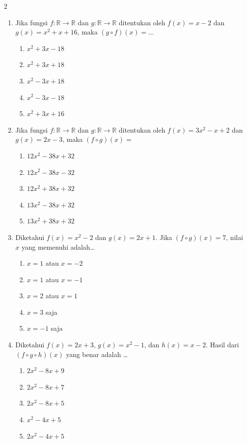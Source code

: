 \documentclass[10pt,a4paper]{article}
\begin{document}
\begin{multicols}{2}
\begin{enumerate}
    \item Jika fungsi $f: \mathbb{R}\to\mathbb{R}$ dan $g: \mathbb{R}\to\mathbb{R}$ ditentukan oleh $f(x)=x-2$ dan $g(x)=x^2+x+16$, maka $(g\circ f)(x)=\dots$
    \begin{enumerate}
        \item $x^2+3x-18$
        \item $x^2+3x+18$
        \item $x^2-3x+18$
        \item $x^2-3x-18$
        \item $x^2+3x+16$
    \end{enumerate}

    \item Jika fungsi $f: \mathbb{R}\to\mathbb{R}$ dan $g: \mathbb{R}\to\mathbb{R}$ ditentukan oleh $f(x)=3x^2-x+2$ dan $g(x)=2x-3$, maka $(f\circ g)(x)=$
    \begin{enumerate}
        \item $12x^2-38x+32$
        \item $12x^2-38x-32$
        \item $12x^2+38x+32$
        \item $13x^2-38x+32$
        \item $13x^2+38x+32$
    \end{enumerate}

    \item Diketahui $f(x)=x^2-2$ dan $g(x)=2x+1$. Jika $(f\circ g)(x)=7$, nilai $x$ yang memenuhi adalah\dots
    \begin{enumerate}
        \item $x = 1$ atau $x = -2$
        \item $x = 1$ atau $x = -1$
        \item $x = 2$ atau $x = 1$
        \item $x = 3$ saja
        \item $x = -1$ saja
    \end{enumerate}

    \item Diketahui $f(x)=2x+3$, $g(x)=x^2-1$, dan $h(x)=x-2$. Hasil dari $(f\circ g\circ h)(x)$ yang benar adalah \dots
    \begin{enumerate}
        \item $2x^2-8x+9$
        \item $2x^2-8x+7$
        \item $2x^2-8x+5$
        \item $x^2-4x+5$
        \item $2x^2-4x+5$
    \end{enumerate}


\end{enumerate}
\end{multicols}
\end{document}
